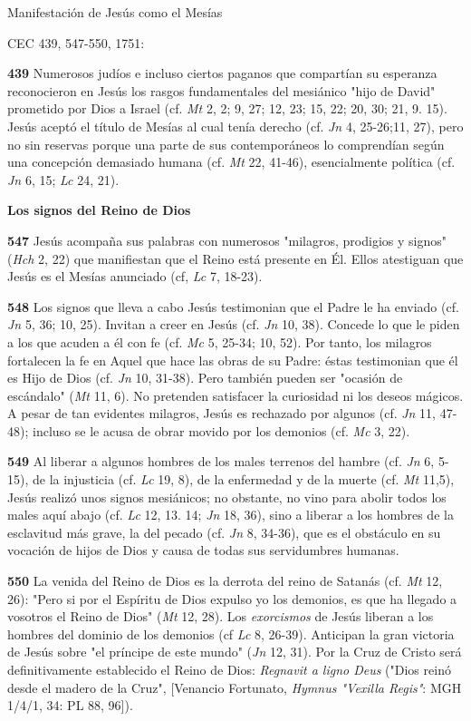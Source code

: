 \documentclass[]{article}
\begin{document}
Manifestación de Jesús como el Mesías

CEC 439, 547-550, 1751:

\textbf{439} Numerosos judíos e incluso ciertos paganos que compartían
su esperanza reconocieron en Jesús los rasgos fundamentales del
mesiánico "hijo de David" prometido por Dios a Israel (cf. \emph{Mt} 2,
2; 9, 27; 12, 23; 15, 22; 20, 30; 21, 9. 15). Jesús aceptó el título de
Mesías al cual tenía derecho (cf. \emph{Jn} 4, 25-26;11, 27), pero no
sin reservas porque una parte de sus contemporáneos lo comprendían según
una concepción demasiado humana (cf. \emph{Mt} 22, 41-46), esencialmente
política (cf. \emph{Jn} 6, 15; \emph{Lc} 24, 21).

\textbf{Los signos del Reino de Dios}

\textbf{547} Jesús acompaña sus palabras con numerosos "milagros,
prodigios y signos" (\emph{Hch} 2, 22) que manifiestan que el Reino está
presente en Él. Ellos atestiguan que Jesús es el Mesías anunciado (cf,
\emph{Lc} 7, 18-23).

\textbf{548} Los signos que lleva a cabo Jesús testimonian que el Padre
le ha enviado (cf. \emph{Jn} 5, 36; 10, 25). Invitan a creer en Jesús
(cf. \emph{Jn} 10, 38). Concede lo que le piden a los que acuden a él
con fe (cf. \emph{Mc} 5, 25-34; 10, 52). Por tanto, los milagros
fortalecen la fe en Aquel que hace las obras de su Padre: éstas
testimonian que él es Hijo de Dios (cf. \emph{Jn} 10, 31-38). Pero
también pueden ser "ocasión de escándalo" (\emph{Mt} 11, 6). No
pretenden satisfacer la curiosidad ni los deseos mágicos. A pesar de tan
evidentes milagros, Jesús es rechazado por algunos (cf. \emph{Jn} 11,
47-48); incluso se le acusa de obrar movido por los demonios (cf.
\emph{Mc} 3, 22).

\textbf{549} Al liberar a algunos hombres de los males terrenos del
hambre (cf. \emph{Jn} 6, 5-15), de la injusticia (cf. \emph{Lc} 19, 8),
de la enfermedad y de la muerte (cf. \emph{Mt} 11,5), Jesús realizó unos
signos mesiánicos; no obstante, no vino para abolir todos los males aquí
abajo (cf. \emph{Lc} 12, 13. 14; \emph{Jn} 18, 36), sino a liberar a los
hombres de la esclavitud más grave, la del pecado (cf. \emph{Jn} 8,
34-36), que es el obstáculo en su vocación de hijos de Dios y causa de
todas sus servidumbres humanas.

\textbf{550} La venida del Reino de Dios es la derrota del reino de
Satanás (cf. \emph{Mt} 12, 26): "Pero si por el Espíritu de Dios expulso
yo los demonios, es que ha llegado a vosotros el Reino de Dios"
(\emph{Mt} 12, 28). Los \emph{exorcismos} de Jesús liberan a los hombres
del dominio de los demonios (cf \emph{Lc} 8, 26-39). Anticipan la gran
victoria de Jesús sobre "el príncipe de este mundo" (\emph{Jn} 12, 31).
Por la Cruz de Cristo será definitivamente establecido el Reino de Dios:
\emph{Regnavit a ligno Deus} ("Dios reinó desde el madero de la Cruz",
{[}Venancio Fortunato, \emph{Hymnus "Vexilla Regis"}: MGH 1/4/1, 34: PL
88, 96{]}).
\end{document}
